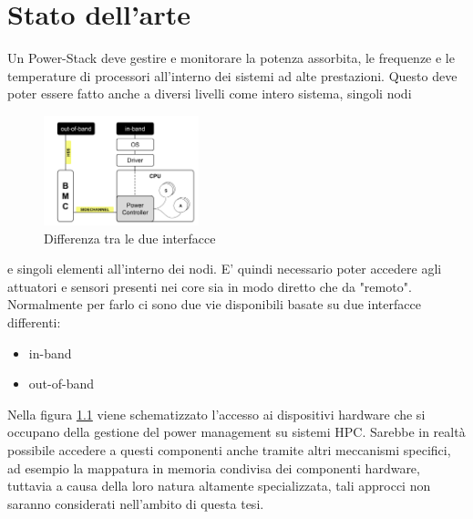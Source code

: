 
\chapter{Stato dell'arte}
Un Power-Stack deve gestire e monitorare la potenza assorbita, le frequenze e le temperature di processori all'interno dei sistemi ad alte prestazioni. Questo deve poter essere fatto anche a diversi livelli come intero sistema, singoli nodi
\setlength{\intextsep}{1pt} %
\begin{figure}
    \includegraphics[width=0.4\textwidth]{img/SoA.png}
    \centering
    \caption{Differenza tra le due interfacce} 
    \label{fig:SoAinoutband}
\end{figure}
e singoli elementi all'interno dei nodi. E' quindi necessario poter accedere agli attuatori e sensori presenti nei core sia in modo diretto che da "remoto". Normalmente per farlo ci sono due vie disponibili basate su due interfacce differenti:
\begin{itemize}
    \item in-band
    \item out-of-band
\end{itemize}
Nella figura \ref{fig:SoAinoutband} viene schematizzato l'accesso ai dispositivi hardware che si occupano della gestione del power management su sistemi HPC. Sarebbe in realtà possibile accedere a questi componenti anche tramite altri meccanismi specifici, ad esempio la mappatura in memoria condivisa dei componenti hardware, tuttavia a causa della loro natura altamente specializzata, tali approcci non saranno considerati nell'ambito di questa tesi.


